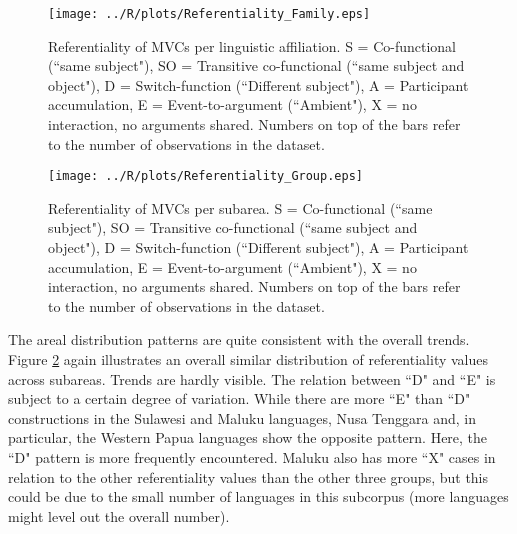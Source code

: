 \begin{figure}
\texttt{[image: ../R/plots/Referentiality\_Family.eps]}
\caption[Referentiality of MVCs per linguistic affiliation]{Referentiality of MVCs per linguistic affiliation. S = Co-functional (``same subject"), SO = Transitive co-functional (``same subject and object"), D = Switch-function (``Different subject"), A = Participant accumulation, E = Event-to-argument (``Ambient"), X = no interaction, no arguments shared. Numbers on top of the bars refer to the number of observations in the dataset.}\label{fig:ref-family}
\end{figure}
\begin{figure}
\texttt{[image: ../R/plots/Referentiality\_Group.eps]}
\caption[Referentiality of MVCs per subarea]{Referentiality of MVCs per subarea. S = Co-functional (``same subject"), SO = Transitive co-functional (``same subject and object"), D = Switch-function (``Different subject"), A = Participant accumulation, E = Event-to-argument (``Ambient"), X = no interaction, no arguments shared. Numbers on top of the bars refer to the number of observations in the dataset.}\label{fig:ref-group}
\end{figure}

The areal distribution patterns are quite consistent with the overall trends. Figure \ref{fig:ref-group} again illustrates an overall similar distribution of referentiality values across subareas. Trends are hardly visible. The relation between ``D" and ``E" is subject to a certain degree of variation. While there are more ``E" than ``D" constructions in the Sulawesi and Maluku languages, Nusa Tenggara and, in particular, the Western Papua languages show the opposite pattern. Here, the ``D" pattern is more frequently encountered. Maluku also has more ``X" cases in relation to the other referentiality values than the other three groups, but this could be due to the small number of languages in this subcorpus (more languages might level out the overall number).

